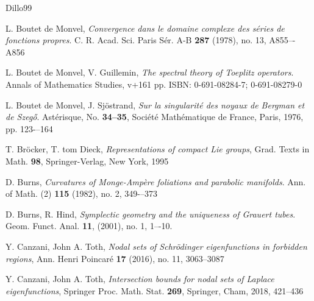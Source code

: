 \documentclass[12pt,a4paper]{article}
\theoremstyle{plain}
\theoremstyle{definition}
\begin{document}
\begin{thebibliography}{Dillo99}


L. Boutet de Monvel, {\em 
Convergence dans le domaine complexe des s\'{e}ries de fonctions propres}. C. R. Acad. Sci. Paris Sér. A-B \textbf{287} (1978), no. 13, 
A855–-A856


L. Boutet de Monvel, V. Guillemin, {\em 
The spectral theory of Toeplitz operators}. Annals of Mathematics Studies, %
v+161 pp. ISBN: 0-691-08284-7; 0-691-08279-0 

 L. Boutet de Monvel, J. Sj\"{o}strand, 
{\em Sur la singularit\'{e} des noyaux de Bergman et de Szeg\H{o}}.
%
Ast\'{e}risque, No. \textbf{34--35},
Soci\'{e}t\'{e} Math\'{e}matique de France, Paris, 1976, pp. 123-–164

T. Br\"{o}cker, T. tom Dieck,
{\em Representations of compact Lie groups},
Grad. Texts in Math. \textbf{98},
Springer-Verlag, New York, 1995


D. Burns, {\em
Curvatures of Monge-Amp\`{e}re foliations and parabolic manifolds}.
Ann. of Math. (2) \textbf{115} (1982), no. 2, 349-–373

D. Burns, R. Hind, {\em Symplectic geometry and the uniqueness of Grauert tubes}.
Geom. Funct. Anal. \textbf{11}, (2001), no. 1, 1–-10.


Y. Canzani, John A. Toth, 
{\em Nodal sets of Schrödinger eigenfunctions in forbidden regions},
Ann. Henri Poincaré \textbf{17} (2016), no. 11, 3063–3087

Y. Canzani, John A. Toth, 
{\em  Intersection bounds for nodal sets of Laplace eigenfunctions},
Springer Proc. Math. Stat. \textbf{269},
Springer, Cham, 2018, 421–436


\end{thebibliography}
\end{document}
